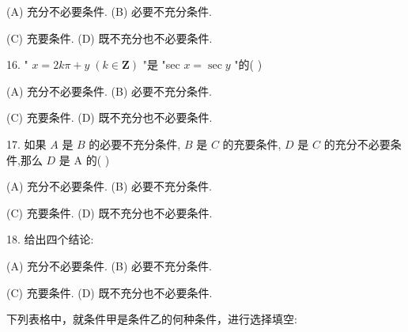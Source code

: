 \documentclass[10pt]{article}
\begin{document}
(A) 充分不必要条件. (B) 必要不充分条件.

(C) 充要条件. (D) 既不充分也不必要条件.

16. " \(x = {2k\pi } + y\;\left( {k \in  \mathbf{Z}}\right)\) "是 "sec \(x = \sec y\) "的( )

(A) 充分不必要条件. (B) 必要不充分条件.

(C) 充要条件. (D) 既不充分也不必要条件.

17. 如果 \(A\) 是 \(B\) 的必要不充分条件, \(B\) 是 \(C\) 的充要条件, \(D\) 是 \(C\) 的充分不必要条件,那么 \(D\) 是 A 的( )

(A) 充分不必要条件. (B) 必要不充分条件.

(C) 充要条件. (D) 既不充分也不必要条件.

18. 给出四个结论:

(A) 充分不必要条件. (B) 必要不充分条件.

(C) 充要条件. (D) 既不充分也不必要条件.

下列表格中，就条件甲是条件乙的何种条件，进行选择填空:

\begin{center}
\end{center}
\end{document}
